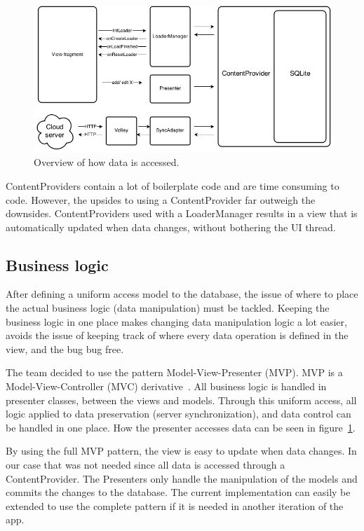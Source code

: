 \begin{figure}[H]
\includegraphics[width=\textwidth]{ch/architecture/fig/arch_app_overview.png}
\caption{Overview of how data is accessed.}
\label{fig:archAppOverview}
\end{figure}

ContentProviders contain a lot of boilerplate code and are time consuming to code. However, the upsides to using a ContentProvider far outweigh the downsides. ContentProviders used with a LoaderManager results in a view that is automatically updated when data changes, without bothering the UI thread.

\subsection{Business logic}
After defining a uniform access model to the database, the issue of where to place the actual business logic (data manipulation) must be tackled. Keeping the business logic in one place makes changing data manipulation logic a lot easier, avoids the issue of keeping track of where every data operation is defined in the view, and the bug bug free.

The team decided to use the pattern Model-View-Presenter (MVP). MVP is a Model-View-Controller (MVC) derivative~\cite{mvc}. All business logic is handled in presenter classes, between the views and models. Through this uniform access, all logic applied to data preservation (server synchronization), and data control can be handled in one place. How the presenter accesses data can be seen in figure~\ref{fig:archAppOverview}.

By using the full MVP pattern, the view is easy to update when data changes. In our case that was not needed since all data is accessed through a ContentProvider. The Presenters only handle the manipulation of the models and commits the changes to the database. The current implementation can easily be extended to use the complete pattern if it is needed in another iteration of the app.  

